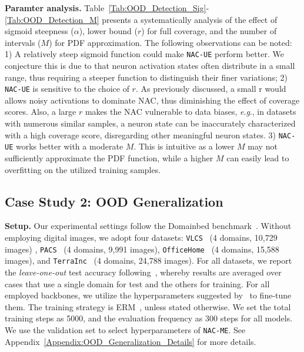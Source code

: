 \documentclass{article} \usepackage{iclr2024_conference,times}
\newcommand{\eg}{\textit{e}.\textit{g}.}
\newcommand{\bfstart}[1]{\noindent\textbf{#1.}}
\begin{document}
\bfstart{Paramter analysis} Table~\ref{Tab:OOD_Detection_Sig}-\ref{Tab:OOD_Detection_M} presents a systematically analysis of the effect of sigmoid steepness ($\alpha$), lower bound ($r$) for full coverage, and the number of intervals ($M$) for PDF approximation. The following observations can be noted: 
1) A relatively steep sigmoid function could make \texttt{NAC-UE} perform better. We conjecture this is due to that neuron activation states often distribute in a small range, thus requiring a steeper function to distinguish their finer variations;
2) \texttt{NAC-UE} is sensitive to the choice of $r$. 
As previously discussed, a small r would allows noisy activations to dominate NAC, thus diminishing the effect of coverage scores. Also, a large $r$ makes the NAC vulnerable to data biases, \eg, in datasets with numerous similar samples, a neuron state can be inaccurately characterized with a high coverage score, disregarding other meaningful neuron states.
3) \texttt{NAC-UE} works better with a moderate $M$.
This is intuitive as a lower $M$ may not sufficiently approximate the PDF function, while a higher $M$ can easily lead to overfitting on the utilized training samples.



























\vspace{-1mm}
\subsection{Case Study 2: OOD Generalization}
\vspace{-1mm}
\label{Sec:Exp_OOD_Generalization}
\bfstart{Setup} Our experimental settings follow the Domainbed benchmark~\citep{Setup:DomainBed}. Without employing digital images, we adopt four datasets: \texttt{VLCS}~\citep{Dataset:VLCS} (4 domains, 10,729 images) , \texttt{PACS}~\citep{Dataset:PACS} (4 domains, 9,991 images), \texttt{OfficeHome}~\citep{Dataset:OfficeHome} (4 domains, 15,588 images), and \texttt{TerraInc}~\citep{Dataset:TerraIncognita} (4 domains, 24,788 images). 
For all datasets, we report the \textit{leave-one-out} test accuracy following~\citep{Setup:DomainBed}, whereby results are averaged over cases that use a single domain for test and the others for training. 
For all employed backbones, we utilize the hyperparameters suggested by~\citep{tech:swad} to fine-tune them. 
The training strategy is ERM~\citep{Baseline:ERM}, unless stated otherwise. 
We set the total training steps as 5000, and the evaluation frequency as 300 steps for all models. 
We use the validation set to select hyperparameters of \texttt{NAC-ME}. See Appendix~\ref{Appendix:OOD_Generalization_Details} for more details.
\end{document}
